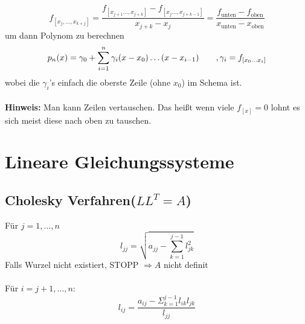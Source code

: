 \documentclass[
ngerman,
accentcolor=9c,%
type=intern,
marginpar=false
]{tudapub}
\begin{document}
            \begin{equation*}
                f_{[x_j,\dots,x_{k+j}]} = \dfrac{f_{[x_{j+1} \dots, x_{j+k}]} - f_{[x_{j} \dots, x_{j+k-1}]}}{x_{j+k} - x_j} = \dfrac{f_{\text{unten}} - f_{\text{oben}}}{x_{\text{unten}} - x_{\text{oben}}}
            \end{equation*}
            um dann Polynom zu berechnen
            \begin{equation*}
                p_n(x) = \gamma_0 + \sum_{i=1}^{n} \gamma_i (x-x_0) \dots (x-x_{i-1}) \tag*{$, \gamma_i = f_{[x_0 \dots x_i]}$}
            \end{equation*}
            wobei die $\gamma_i$'s einfach die oberste Zeile (ohne $x_0$) im Schema ist.\\
            \\
            \textbf{Hinweis:} Man kann Zeilen vertauschen. Das heißt wenn viele $f_{[x]} = 0$ lohnt es sich meist diese nach oben zu tauschen.

    \newpage
    \section{Lineare Gleichungssysteme}
        \subsection{Cholesky Verfahren\hspace{1em}($LL^T = A$)}
            Für $j= 1,\dots ,n$
            \begin{equation*}
                l_{jj} =\sqrt{a_{jj}-\sum^{j-1}_{k=1}l_{jk}^2}
            \end{equation*}
            Falls Wurzel nicht existiert, STOPP $\Rightarrow A$ nicht definit\\
            \\
            \hspace{20mm} Für $i=j+1,\dots,n:$
            \begin{equation*}
                l_{ij} = \dfrac{a_{ij}-\Sigma_{k=1}^{j-1}l_{ik}l_{jk}}{l_{jj}}
            \end{equation*}
\end{document}
